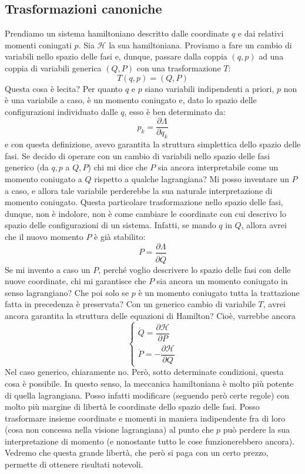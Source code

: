 \documentclass[a4paper,openany]{article}
\begin{document}
	\subsection{Trasformazioni canoniche}
	Prendiamo un sistema hamiltoniano descritto dalle coordinate $q$ e dai relativi momenti coniugati $p$. Sia $\mathcal{H}$ la sua hamiltoniana. Proviamo a fare un cambio di variabili nello spazio delle fasi e, dunque, passare dalla coppia $(q,p)$ ad una coppia di variabili generica $(Q,P)$ con una trasformazione $T$:
	$$
	T(q,p) = (Q,P)
	$$
	Questa cosa è lecita? Per quanto $q$ e $p$ siano variabili indipendenti a priori, $p$ non è una variabile a caso, è un momento coniugato e, dato lo spazio delle configurazioni individuato dalle $q$, esso è ben determinato da:
	$$
	p_k = \dfrac{\partial \Lambda}{\partial \dot{q}_k}
	$$
	e con questa definizione, avevo garantita la struttura simplettica dello spazio delle fasi. Se decido di operare con un cambio di variabili nello spazio delle fasi generico (da $q,p$ a $Q,P$) chi mi dice che $P$ sia ancora interpretabile come un momento coniugato a $Q$ rispetto a qualche lagrangiana? Mi posso inventare un $P$ a caso, e allora tale variabile perderebbe la sua naturale interpretazione di momento coniugato. Questa particolare trasformazione nello spazio delle fasi, dunque, non è indolore, non è come cambiare le coordinate con cui descrivo lo spazio delle configurazioni di un sistema. Infatti, se mando $q$ in $Q$, allora avrei che il nuovo momento $P$ è già stabilito:
	$$
	P = \dfrac{\partial \Lambda}{\partial \dot{Q}}
	$$ 
	Se mi invento a caso un $P$, perché voglio descrivere lo spazio delle fasi con delle nuove coordinate, chi mi garantisce che $P$ sia ancora un momento coniugato in senso lagrangiano? Che poi solo se $p$ è un momento coniugato tutta la trattazione fatta in precedenza è preservata? Con un generico cambio di variabile $T$, avrei ancora garantita la struttura delle equazioni di Hamilton? Cioè, varrebbe ancora
	\begin{equation}\label{key}
		\begin{cases}
			\dot{Q} = \dfrac{\partial \mathcal{H}}{\partial P} \\
			\dot{P} =- \dfrac{\partial \mathcal{H}}{\partial Q}
		\end{cases}
	\end{equation}
	Nel caso generico, chiaramente no. Però, sotto determinate condizioni, questa cosa è possibile. In questo senso, la meccanica hamiltoniana è molto più potente di quella lagrangiana. Posso infatti modificare (seguendo però certe regole) con molto più margine di libertà le coordinate dello spazio delle fasi. Posso trasformare insieme coordinate e momenti in maniera indipendente fra di loro (cosa non concessa nella visione lagrangiana) al punto che $p$ può perdere la sua interpretazione di momento (e nonostante tutto le cose funzionerebbero ancora). Vedremo che questa grande libertà, che però si paga con un certo prezzo, permette di ottenere risultati notevoli.
	
\end{document}
